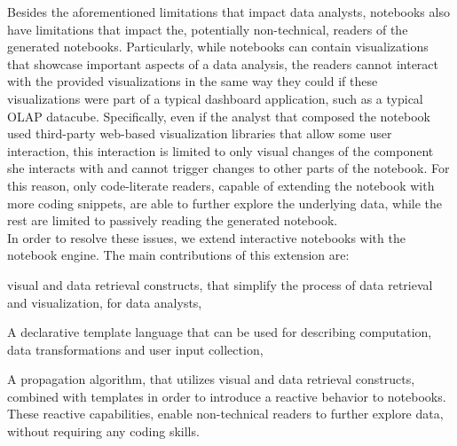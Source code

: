 Besides the aforementioned limitations that impact data analysts, notebooks also have limitations that impact the, potentially non-technical, readers of the generated notebooks. Particularly, while notebooks can contain visualizations that showcase important aspects of a data analysis, the readers cannot interact with the provided visualizations in the same way they could if these visualizations were part of a typical dashboard application, such as a typical OLAP datacube.  Specifically, even if the analyst that composed the notebook used third-party web-based visualization libraries that allow some user interaction, this interaction is limited to only visual changes of the component she interacts with and cannot trigger changes to other parts of the notebook. For this reason, only code-literate readers, capable of extending the notebook with more coding snippets, are able to further explore the underlying data, while the rest are limited to passively reading the generated notebook.\\




In order to resolve these issues, we extend interactive notebooks  with the  {\projname} notebook engine. The main contributions of this extension are: 
\begin{compact_enum} 
\item visual and data retrieval constructs, that simplify the process of data retrieval and visualization, for data analysts, 
\item A declarative template language that can be used for describing computation, data transformations and user input collection, 
\item A propagation algorithm, that utilizes visual and data retrieval constructs, combined with templates in order to introduce a reactive behavior to notebooks. These reactive capabilities, enable non-technical readers to further explore data, without requiring any coding skills. 
\end{compact_enum}

